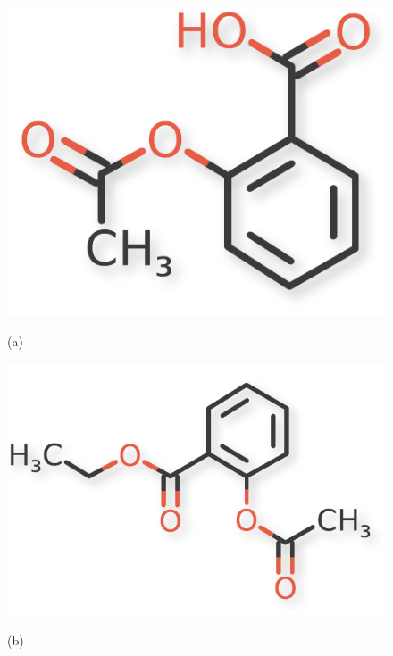 \documentclass{article}
\begin{document}
\begin{figure}[!ht]
\centering
\begin{minipage}{.45\textwidth}
  \centerline{\includegraphics[scale=0.5]{aspirin-crop}}
  \centerline{(a)}
\end{minipage}
\hfill
\begin{minipage}{.45\textwidth}
  \centerline{\includegraphics[scale=0.5]{VX19C5613T-crop}}
  \centerline{(b)}
\end{minipage}
\end{figure}
\end{document}
